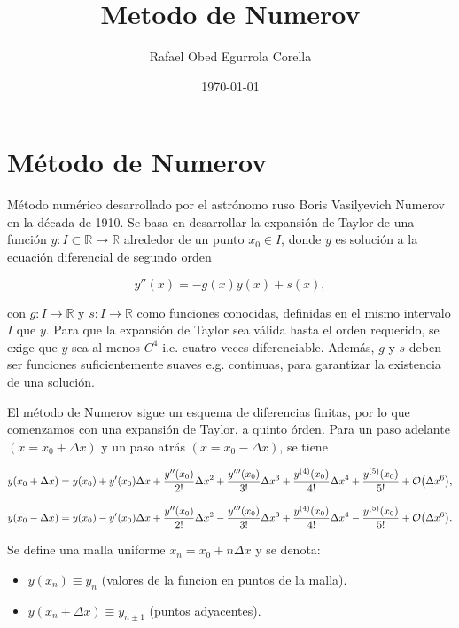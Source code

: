 \documentclass[11pt]{article}
\author{Rafael Obed Egurrola Corella}
\date{\today}
\title{Metodo de Numerov}
\begin{document}
\maketitle
\tableofcontents

\section{Método de Numerov}
\label{sec:orgc0b1011}

Método numérico desarrollado por el astrónomo ruso Boris Vasilyevich Numerov en la década de 1910. Se basa en desarrollar la expansión de Taylor de una función \(y : I \subset \mathbb{R} \to \mathbb{R}\) alrededor de un punto \(x_0 \in I\), donde \(y\) es solución a la ecuación diferencial de segundo orden

\[ y''(x) = - g(x)y(x) + s(x), \]

con \(g: I \to \mathbb{R}\) y \(s: I \to \mathbb{R}\) como funciones conocidas, definidas en el mismo intervalo \(I\) que \(y\). Para que la expansión de Taylor sea válida hasta el orden requerido, se exige que \(y\) sea al menos \(C^4\) i.e. cuatro veces diferenciable. Además, \(g\) y \(s\) deben ser funciones suficientemente suaves e.g. continuas, para garantizar la existencia de una solución.

El método de Numerov sigue un esquema de diferencias finitas, por lo que comenzamos con una expansión de Taylor, a quinto órden. Para un paso adelante \((x= x_{0} + \Delta x)\) y un paso atrás \((x=x_{0} - \Delta x)\), se tiene

\[ y(x_{0} + \Delta x ) = y(x_{0}) + y'(x_{0})\Delta x + \frac{y''(x_{0})}{2!} \Delta x^2 + \frac{y'''(x_{0})}{3!}\Delta x^3 + \frac{y^{(4)}(x_{0})}{4!}\Delta x^4 + \frac{y^{(5)}(x_0)}{5!} + \order{\Delta x^6}, \]

\[ y(x_{0} - \Delta x ) = y(x_{0}) - y'(x_{0})\Delta x + \frac{y''(x_{0})}{2!} \Delta x^2 - \frac{y'''(x_{0})}{3!}\Delta x^3 + \frac{y^{(4)}(x_{0})}{4!}\Delta x^4 - \frac{y^{(5)}(x_0)}{5!} + \order{\Delta x^6}. \]

Se define una malla uniforme \(x_n = x_0 + n\Delta x\) y se denota:

\begin{itemize}
\item \(y(x_n) \equiv y_n\) (valores de la funcion en puntos de la malla).
\item \(y(x_n \pm \Delta x) \equiv y_{n \pm 1}\) (puntos adyacentes).
\end{itemize}
\end{document}
